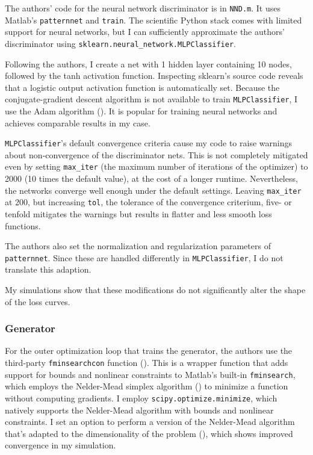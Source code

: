 The authors' code for the neural network discriminator is in \texttt{NND.m}.
It uses Matlab's \texttt{patternnet} and \texttt{train}.
The scientific Python stack comes with limited support for neural networks, but I can sufficiently approximate the authors' discriminator using \texttt{sklearn.neural\_network.MLPClassifier}.

Following the authors, I create a net with 1 hidden layer containing 10 nodes, followed by the tanh activation function.
Inspecting sklearn's source code reveals that a logistic output activation function is automatically set. %
Because the conjugate-gradient descent algorithm is not available to train \texttt{MLPClassifier}, I use the Adam algorithm (\textcite{diederik2014adam}).
It is popular for training neural networks and achieves comparable results in my case. %

\texttt{MLPClassifier}'s default convergence criteria cause my code to raise warnings about non-convergence of the discriminator nets.
This is not completely mitigated even by setting \texttt{max\_iter} (the maximum number of iterations of the optimizer) to 2000 (10 times the default value), at the cost of a longer runtime. %
Nevertheless, the networks converge well enough under the default settings. %
Leaving \texttt{max\_iter} at 200, but increasing \texttt{tol}, the tolerance of the convergence criterium, five- or tenfold mitigates the warnings but results in flatter and less smooth loss functions. %

The authors also set the normalization and regularization parameters of \texttt{patternnet}.
Since these are handled differently in \texttt{MLPClassifier}, I do not translate this adaption.

My simulations show that these modifications do not significantly alter the shape of the loss curves. %

\subsubsection{Generator}

For the outer optimization loop that trains the generator, the authors use the third-party \mbox{\texttt{fminsearchcon}} function (\textcite{DErrico2024}).
This is a wrapper function that adds support for bounds and nonlinear constraints to Matlab's built-in \texttt{fminsearch}, which employs the Nelder-Mead simplex algorithm (\textcite{lagarias1998convergence}) to minimize a function without computing gradients.
I employ \texttt{scipy.optimize.minimize}, which natively supports the Nelder-Mead algorithm with bounds and nonlinear constraints.
I set an option to perform a version of the Nelder-Mead algorithm that's adapted to the dimensionality of the problem (\cite{gao2012implementing}), which shows improved convergence in my simulation. %

